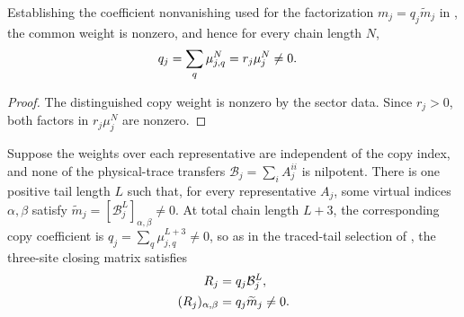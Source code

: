 \begin{lemma}
    \label{thm:mpdo_common_weight_coefficient_ne_zero}
    \leanok
    Establishing the coefficient nonvanishing used for the factorization
    $m_j=q_j\widetilde m_j$ in
    \cite[Appendix~C.2, lines~1714--1718]{Cirac2016MPDO_arXiv}, the common
    weight is nonzero, and hence for every chain length $N$,
    \begin{align}
        q_j=\sum_q\mu_{j,q}^{N} & =r_j\mu_j^{N}\ne0.
        \notag
    \end{align}
\end{lemma}

\begin{proof}\leanok
    The distinguished copy weight is nonzero by the sector data. Since
    $r_j>0$, both factors in $r_j\mu_j^N$ are nonzero.
\end{proof}

\begin{lemma}
    \label{thm:mpdo_common_nonzero_bnt_tail_selection}
    \leanok
    Suppose the weights over each representative are independent of the copy
    index, and none of the physical-trace transfers
    $\mathcal B_j=\sum_i A_j^{ii}$ is nilpotent. There is one positive tail
    length $L$ such that, for every representative $A_j$, some virtual indices
    $\alpha,\beta$ satisfy
    $\widetilde m_j=[\mathcal B_j^L]_{\alpha,\beta}\ne0$.
    At total chain length $L+3$, the corresponding copy coefficient is
    $q_j=\sum_q\mu_{j,q}^{L+3}\ne0$, so as in the traced-tail selection of
    \cite[Appendix~C.2, lines~1714--1718]{Cirac2016MPDO_arXiv}, the three-site
    closing matrix satisfies
    \begin{align}
        R_j & =q_j\mathcal B_j^L,
        \notag                        \\
        (R_j)_{\alpha,\beta}
            & =q_j\widetilde m_j\ne0.
        \notag
    \end{align}
\end{lemma}

